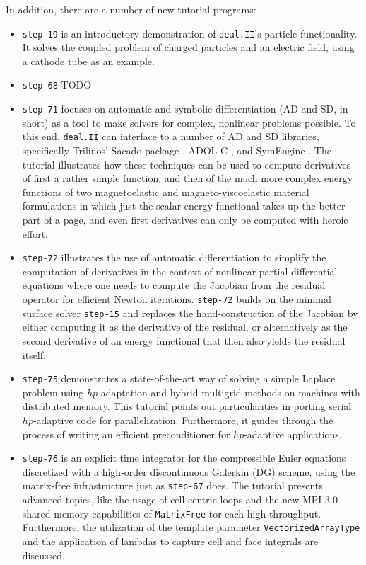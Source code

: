 \documentclass{ansarticle-preprint}
\newcommand{\specialword}[1]{\texttt{#1}}
\newcommand{\dealii}{{\specialword{deal.II}}\xspace}
\begin{document}
In addition, there are a number of new tutorial programs:
\begin{itemize}
\item \texttt{step-19} is an introductory demonstration of \dealii{}'s
  particle functionality. It solves the coupled problem of
  charged particles and an electric field, using a cathode tube as an
  example.

\item \texttt{step-68} TODO

\item \texttt{step-71} focuses on automatic and symbolic
  differentiation (AD and SD, in short) as a tool to make solvers for complex,
  nonlinear problems possible. To this end, \dealii{} can interface to a number
  of AD and SD libraries, specifically Trilinos' Sacado package
  \cite{Bartlett2006a}, ADOL-C \cite{Griewank1996a}, and
  SymEngine \cite{symengine-web-page}. The tutorial
  illustrates how these techniques can be used to compute derivatives
  of first a rather simple function, and then of the much more complex
  energy functions of two magnetoelastic and magneto-viscoelastic
  material formulations in which just the scalar energy functional
  takes up the better part of a page, and even first derivatives can
  only be computed with heroic effort.

\item \texttt{step-72} illustrates the use of automatic
  differentiation to simplify the computation of derivatives in the
  context of nonlinear partial differential equations where one needs
  to compute the Jacobian from the residual operator for efficient
  Newton iterations. \texttt{step-72} builds on the minimal surface
  solver \texttt{step-15} and replaces the hand-construction of the
  Jacobian by either computing it as the derivative of the residual,
  or alternatively as the second derivative of an energy functional
  that then also yields the residual itself.

\item \texttt{step-75} demonstrates a state-of-the-art way of solving a simple
      Laplace problem using $hp$-adaptation and hybrid multigrid methods on machines
      with distributed memory. This tutorial points out particularities in porting
      serial $hp$-adaptive code for parallelization. Furthermore, it guides through
      the process of writing an efficient preconditioner for $hp$-adaptive applications.

\item \texttt{step-76} is an explicit time integrator for the
      compressible Euler equations discretized with a high-order discontinuous
      Galerkin (DG) scheme, using the matrix-free infrastructure just as \texttt{step-67} does.
      The tutorial presents advanced topics, like the usage of cell-centric loops and
      the new MPI-3.0 shared-memory capabilities of \texttt{MatrixFree} tor each high
      throughput. Furthermore, the utilization of the template parameter
      \texttt{VectorizedArrayType} and the application of lambdas to capture cell and face
      integrals are discussed.


\end{itemize}
\end{document}
